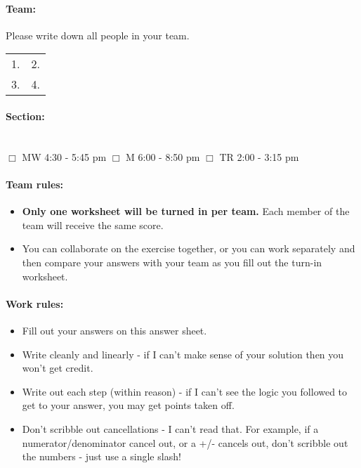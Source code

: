 \documentclass[a4paper,12pt]{book}
\begin{document}
    \paragraph{Team:}
    Please write down all people in your team. ~\\

    \begin{tabular}{ p{6cm} p{6cm} }
        1. & 2. \\
        3. & 4.
    \end{tabular}

    \paragraph{Section:} ~\\
        $\Box$ MW 4:30 - 5:45 pm \tab
        $\Box$ M 6:00 - 8:50 pm \tab
        $\Box$ TR 2:00 - 3:15 pm

    \paragraph{Team rules:}

    \begin{itemize}
        \item \textbf{Only one worksheet will be turned in per team.}
            Each member of the team will receive the same score.
        \item You can collaborate on the exercise together, or you can
            work separately and then compare your answers with your team
            as you fill out the turn-in worksheet.
    \end{itemize}

    \paragraph{Work rules:}

    \begin{itemize}
        \item Fill out your answers on this answer sheet.
        \item Write cleanly and linearly - if I can't make sense of
            your solution then you won't get credit.
        \item Write out each step (within reason) - if I can't see the
            logic you followed to get to your answer, you may get points taken off.
        \item Don't scribble out cancellations - I can't read that.
            For example, if a numerator/denominator cancel out, or a +/-
            cancels out, don't scribble out the numbers - just use a single slash!
    \end{itemize}
\end{document}
